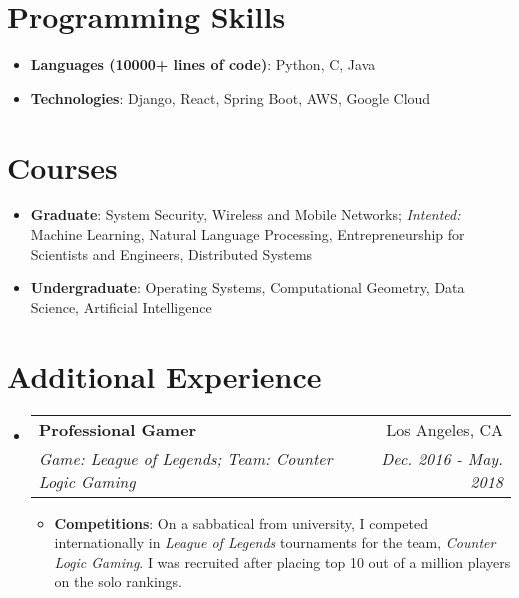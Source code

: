 \documentclass[letterpaper,11pt]{article}
\makeatletter
\newcommand{\resumeItem}[2]{
  \item\small{
    \textbf{#1}{: #2 \vspace{-2pt}}
  }
}
\newcommand{\resumeSubheading}[4]{
  \vspace{-1pt}\item
    \begin{tabular*}{0.97\textwidth}[t]{l@{\extracolsep{\fill}}r}
      \textbf{#1} & #2 \\
      \textit{\small#3} & \textit{\small #4} \\
    \end{tabular*}\vspace{-5pt}
}
\newcommand{\resumeSubItem}[2]{\resumeItem{#1}{#2}\vspace{-4pt}}
\newcommand{\resumeSubHeadingListStart}{\begin{itemize}[leftmargin=*]}
\newcommand{\resumeSubHeadingListEnd}{\end{itemize}}
\newcommand{\resumeItemListStart}{\begin{itemize}}
\newcommand{\resumeItemListEnd}{\end{itemize}\vspace{-5pt}}
\makeatother
\begin{document}
\section{Programming Skills}
  \resumeSubHeadingListStart
    \resumeSubItem{Languages (10000+ lines of code)}
      {Python, C, Java}
    \resumeSubItem{Technologies}
      {Django, React, Spring Boot, AWS, Google Cloud}
  \resumeSubHeadingListEnd


\section{Courses}
  \resumeSubHeadingListStart
    \resumeSubItem{Graduate}
      {System Security, Wireless and Mobile Networks; \textit{Intented:} Machine Learning, Natural
      Language Processing, Entrepreneurship for Scientists and Engineers, Distributed Systems}
    \resumeSubItem{Undergraduate}
      {Operating Systems, Computational Geometry, Data Science, Artificial Intelligence}
  \resumeSubHeadingListEnd

\section{Additional Experience}
  \resumeSubHeadingListStart
    \resumeSubheading
      {Professional Gamer}{Los Angeles, CA}
      {Game: League of Legends; Team: Counter Logic Gaming}{Dec. 2016 - May. 2018}
      \resumeItemListStart
        \resumeItem{Competitions}
          {On a sabbatical from university, I competed internationally in
          \textit{League of Legends} tournaments for the team, \textit{Counter
          Logic Gaming}. I was recruited after placing top 10 out of a million
          players on the solo rankings.}
      \resumeItemListEnd
      \vspace{-5pt}
  \resumeSubHeadingListEnd
\end{document}
